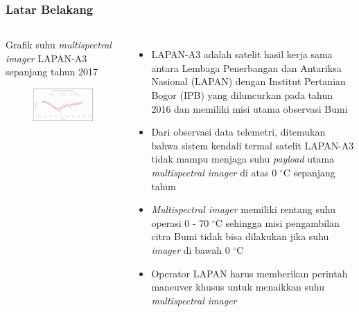 \documentclass[8pt]{beamer}
\begin{document}
\begin{frame}
  \frametitle{Latar Belakang}
  \begin{columns}[T]
            \begin{block}{\center Grafik suhu \textit{multispectral imager} LAPAN-A3 sepanjang tahun 2017}
      \begin{figure}
          \includegraphics[width=1.0\textwidth]{figure/multispectralimager.png}
      \end{figure}
            \end{block}
    \begin{itemize}
        \item LAPAN-A3 adalah satelit hasil kerja sama antara Lembaga Penerbangan dan Antariksa Nasional (LAPAN) dengan Institut Pertanian Bogor (IPB) yang diluncurkan pada tahun 2016 dan memiliki misi utama observasi Bumi \cite{hasbi2013}
      \item Dari observasi data telemetri, ditemukan bahwa sistem kendali termal satelit LAPAN-A3 tidak mampu menjaga suhu \textit{payload} utama \textit{multispectral imager} di atas 0 $^\circ$C sepanjang tahun \cite{ribah2019}
      \item \textit{Multispectral imager} memiliki rentang suhu operasi 0 - 70 $^\circ$C sehingga misi pengambilan citra Bumi tidak bisa dilakukan jika suhu \textit{imager} di bawah 0 $^\circ$C
      \item Operator LAPAN harus memberikan perintah maneuver khusus untuk menaikkan suhu \textit{multispectral imager}
    \end{itemize}
  \end{columns}
\end{frame}
\end{document}
